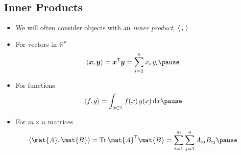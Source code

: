 
\begin{slide}
\section[-1]{Inner Products}

\begin{PauseHighLight}
  \begin{itemize}
  \item We will often consider objects with an \textit{inner product},
    $\left\langle {\,}, {\,}\right\rangle$\pause
  \item For vectors in $\mathbb{R}^n$
    \begin{align*}
      \langle \bm{x}, \bm{y} \rangle = \bm{x}^\tr\bm{y} = \sum_{i=1}^n
      x_i\,y_i \pause
    \end{align*}
  \item For functions\vspace*{-1em}
    \begin{align*}
      \langle f, g \rangle = \int_{x\in\mathcal{I}} f(x)\,g(x)\,\dd x\pause
    \end{align*}
  \item For $m \times n$ matrices\vspace*{-1em}
    \begin{align*}
      \inner{\mat{A}}{\mat{B}} = \mathrm{Tr} \, \mat{A}^\tr \mat{B} =
      \sum_{i=1}^m \sum_{j=1}^n A_{ij} B_{ij}\pause
    \end{align*}
  \end{itemize}
\end{PauseHighLight}

\end{slide}


